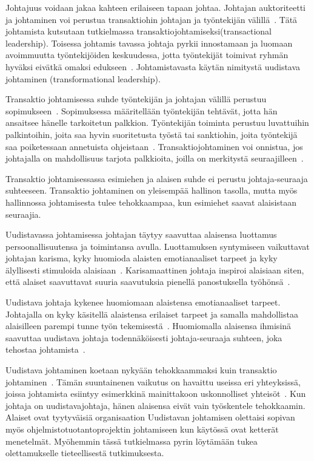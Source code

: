 \documentclass[finnish]{tktltiki2}
\theoremstyle{definition}
\theoremstyle{remark}
\begin{document}
Johtajuus voidaan jakaa kahteen erilaiseen tapaan johtaa. Johtajan auktoriteetti ja johtaminen voi perustua transaktiohin johtajan ja työntekijän välillä~\cite{bass1990transactional}. Tätä johtamista kutsutaan tutkielmassa transaktiojohtamiseksi(transactional leadership). Toisessa johtamis tavassa johtaja pyrkii innostamaan ja luomaan avoimmuutta työntekijöiden keskuudessa, jotta työntekijät toimivat ryhmän hyväksi eivätkä omaksi edukseen~\cite{bass1990transactional}. Johtamistavasta käytän nimitystä uudistava johtaminen (transformational leadership). 

Transaktio johtamisessa suhde työntekijän ja johtajan välillä  perustuu sopimukseen~\cite{bass1990transactional}. Sopimuksessa määritellään työntekijän tehtävät, jotta hän ansaitsee hänelle tarkoitetun palkkion. Työntekijän toiminta perustuu luvattuihin palkintoihin, joita saa hyvin suoritetusta työstä tai sanktiohin, joita työntekijä saa poiketessaan annetuista ohjeistaan~\cite{bass1990transactional}. Transaktiojohtaminen voi onnistua, jos johtajalla on mahdollisuus tarjota palkkioita, joilla on merkitystä seuraajilleen~\cite{bass1990transactional}. 

Transaktio johtamisessassa esimiehen ja alaisen suhde ei perustu johtaja-seuraaja suhteeseen. Transaktio johtaminen on yleisempää hallinon tasolla, mutta myös hallinnossa johtamisesta tulee tehokkaampaa, kun esimiehet saavat alaisistaan seuraajia.  

Uudistavassa johtamisessa johtajan täytyy saavuttaa alaisensa luottamus persoonallisuutensa ja toimintansa avulla. Luottamuksen syntymiseen vaikuttavat johtajan karisma, kyky huomioda alaisten emotianaaliset tarpeet ja kyky älyllisesti stimuloida alaisiaan~\cite{bass1990transactional}. Karisamaattinen johtaja inspiroi alaisiaan siten, että alaiset saavuttavat suuria saavutuksia pienellä panostuksella työhönsä~\cite{bass1990transactional}.

Uudistava johtaja kykenee huomiomaan alaistensa emotianaaliset tarpeet. Johtajalla on kyky käsitellä alaistensa erilaiset tarpeet ja samalla mahdollistaa alaisilleen parempi tunne työn tekemisestä~\cite{palmer2001emotional}. Huomiomalla alaisensa ihmisinä saavuttaa uudistava johtaja todennäköisesti johtaja-seuraaja suhteen, joka tehostaa johtamista~\cite{raccoon2006leadership}.

Uudistava johtaminen koetaan nykyään tehokkaammaksi kuin transaktio johtaminen~\cite{palmer2001emotional}. Tämän suuntainenen vaikutus on havaittu useissa eri yhteyksissä, joissa johtamista esiintyy esimerkkinä mainittakoon uskonnolliset yhteisöt~\cite{bass1990transactional}. Kun johtaja on uudistavajohtaja, hänen alaisensa eivät vain työskentele tehokkaamin. Alaiset ovat tyytyväisiä organisaation  Uudistavan johtamisen olettaisi sopivan myös ohjelmistotuotantoprojektin johtamiseen kun käytössä ovat ketterät menetelmät. Myöhemmin tässä tutkielmassa pyrin löytämään tukea olettamukselle tieteellisestä tutkimuksesta. 
   
\end{document}
